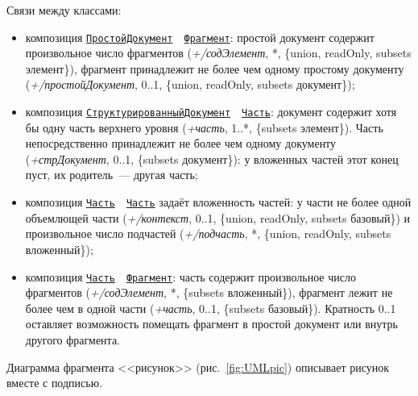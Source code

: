Связи между классами:
\begin{itemize}
	\item композиция \hyperref[fig:UMLdoc]{\Verb|ПростойДокумент|}~~\hyperref[fig:UMLdoc]{\Verb|Фрагмент|}: простой документ содержит произвольное число фрагментов (\textit{+/содЭлемент}, *, \{union, readOnly, subsets элемент\}), фрагмент принадлежит не более чем одному простому документу (\textit{+/простойДокумент}, 0..1, \{union, readOnly, subsets документ\});
	\item композиция \hyperref[fig:UMLdoc]{\Verb|СтруктурированныйДокумент|}~~\hyperref[fig:UMLdoc]{\Verb|Часть|}: документ содержит хотя бы одну часть верхнего уровня (\textit{+часть}, 1..*, \{subsets элемент\}). Часть непосредственно принадлежит не более чем одному документу (\textit{+стрДокумент}, 0..1, \{subsets документ\}): у вложенных частей этот конец пуст, их родитель~--- другая часть;
	\item композиция \hyperref[fig:UMLdoc]{\Verb|Часть|}~~\hyperref[fig:UMLdoc]{\Verb|Часть|} задаёт вложенность частей: у части не более одной объемлющей части (\textit{+/контекст}, 0..1, \{union, readOnly, subsets базовый\}) и произвольное число подчастей (\textit{+/подчасть}, *, \{union, readOnly, subsets вложенный\});
	\item композиция \hyperref[fig:UMLdoc]{\Verb|Часть|}~~\hyperref[fig:UMLdoc]{\Verb|Фрагмент|}: часть содержит произвольное число фрагментов (\textit{+/содЭлемент}, *, \{subsets вложенный\}), фрагмент лежит не более чем в одной части (\textit{+часть}, 0..1, \{subsets базовый\}). Кратность 0..1 оставляет возможность помещать фрагмент в простой документ или внутрь другого фрагмента.
\end{itemize}

Диаграмма фрагмента <<рисунок>> (рис.~\ref{fig:UMLpic}) описывает рисунок вместе с подписью.

